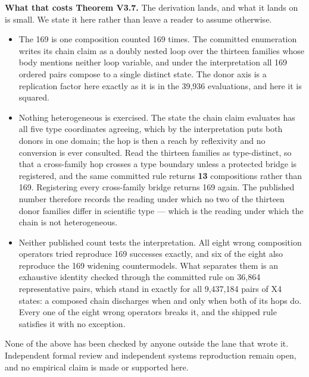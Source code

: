 \textbf{What that costs Theorem V3.7.} The derivation lands, and what it lands on is small. We state it here rather than leave a reader to assume otherwise.

\begin{itemize}
  \item The 169 is one composition counted 169 times. The committed enumeration writes its chain claim as a doubly nested loop over the thirteen families whose body mentions neither loop variable, and under the interpretation all 169 ordered pairs compose to a single distinct state. The donor axis is a replication factor here exactly as it is in the 39,936 evaluations, and here it is squared.
  \item Nothing heterogeneous is exercised. The state the chain claim evaluates has all five type coordinates agreeing, which by the interpretation puts both donors in one domain; the hop is then a reach by reflexivity and no conversion is ever consulted. Read the thirteen families as type-distinct, so that a cross-family hop crosses a type boundary unless a protected bridge is registered, and the same committed rule returns \textbf{13} compositions rather than 169. Registering every cross-family bridge returns 169 again. The published number therefore records the reading under which no two of the thirteen donor families differ in scientific type --- which is the reading under which the chain is not heterogeneous.
  \item Neither published count tests the interpretation. All eight wrong composition operators tried reproduce 169 successes exactly, and six of the eight also reproduce the 169 widening countermodels. What separates them is an exhaustive identity checked through the committed rule on 36,864 representative pairs, which stand in exactly for all 9,437,184 pairs of X4 states: a composed chain discharges when and only when both of its hops do. Every one of the eight wrong operators breaks it, and the shipped rule satisfies it with no exception.
\end{itemize}

None of the above has been checked by anyone outside the lane that wrote it. Independent formal review and independent systems reproduction remain open, and no empirical claim is made or supported here.
